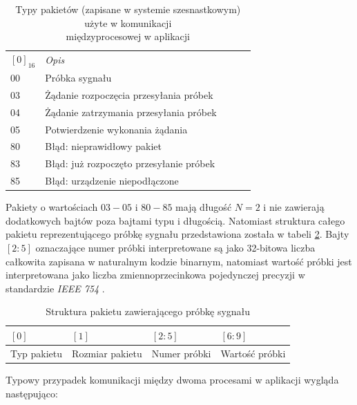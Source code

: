 \begin{table}[h!]
\centering
    \caption{Typy pakietów (zapisane w systemie szesnastkowym)
    użyte w komunikacji \\międzyprocesowej w aplikacji}
\label{tab:ipc_types}
\begin{tabular}{|l|l|lll}
\cline{1-2}
$[0]_{16}$ & \textit{Opis}             &  &  &  \\ \cline{1-2}
00 & Próbka sygnału                         &  &  &  \\ \cline{1-2}
03 & Żądanie rozpoczęcia przesyłania próbek &  &  &  \\ \cline{1-2}
04 & Żądanie zatrzymania przesyłania próbek &  &  &  \\ \cline{1-2}
05 & Potwierdzenie wykonania żądania        &  &  &  \\ \cline{1-2}
80 & Błąd: nieprawidłowy pakiet             &  &  &  \\ \cline{1-2}
83 & Błąd: już rozpoczęto przesyłanie próbek&  &  &  \\ \cline{1-2}
85 & Błąd: urządzenie niepodłączone         &  &  &  \\ \cline{1-2}
\end{tabular}
\end{table}

Pakiety o wartościach $03-05$ i $80-85$ mają długość $N=2$ i nie zawierają dodatkowych 
bajtów poza bajtami typu i długością.
Natomiast struktura całego pakietu reprezentującego próbkę sygnału przedstawiona została w tabeli
\ref{tab:ipc_sample_pack}. Bajty $[2:5]$ oznaczające numer próbki interpretowane są jako 32-bitowa
liczba całkowita zapisana w naturalnym kodzie binarnym, 
natomiast wartość próbki jest interpretowana jako liczba zmiennoprzecinkowa pojedynczej precyzji w standardzie \textit{IEEE 754} \cite{IEE754}.

\begin{table}[h!]
\centering
\caption{Struktura pakietu zawierającego próbkę sygnału}
\label{tab:ipc_sample_pack}
\begin{tabular}{|l|l|l|l|}
\hline
$[0]$       & $[1]$           & $[2:5]$      & $[6:9]$        \\ \hline
Typ pakietu & Rozmiar pakietu & Numer próbki & Wartość próbki \\ \hline
\end{tabular}
\end{table}

\newpage

Typowy przypadek komunikacji między dwoma procesami w aplikacji wygląda następująco:

